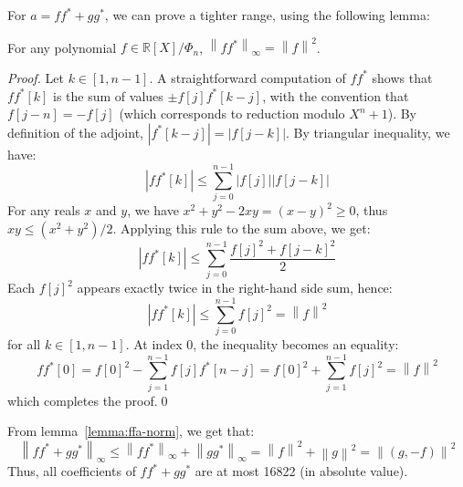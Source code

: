 \documentclass{llncs}
\newcommand{\bR}{\mathbb{R}}
\newcommand{\norm}[1]{\left\|#1\right\|}
\newcommand{\norminf}[1]{\norm{#1}_{\infty}}
\newcommand{\adj}[1]{{#1}^*}
\begin{document}
For $a = f\adj{f} + g\adj{g}$, we can prove a tighter range, using
the following lemma:
\begin{lemma}\label{lemma:ffa-norm}
For any polynomial $f \in \bR[X]/\Phi_n$, $\norminf{f\adj{f}} = \norm{f}^2$.
\end{lemma}
\begin{proof}
Let $k\in [1, n-1]$. A straightforward computation of $f\adj{f}$ shows
that $f\adj{f}[k]$ is the sum of values $\pm f[j] \adj{f}[k - j]$, with
the convention that $f[j - n] = -f[j]$ (which corresponds to reduction
modulo $X^n + 1$). By definition of the adjoint,
$|\adj{f}[k - j]| = |f[j - k]|$. By triangular inequality, we have:
\begin{equation*}
    |f\adj{f}[k]| \leq \sum_{j=0}^{n-1} |f[j]| |f[j - k]|
\end{equation*}
For any reals $x$ and $y$, we have $x^2 + y^2 - 2xy = (x - y)^2 \geq 0$,
thus $xy \leq (x^2 + y^2)/2$. Applying this rule to the sum above, we
get:
\begin{equation*}
    |f\adj{f}[k]| \leq \sum_{j=0}^{n-1} \frac{f[j]^2 + f[j - k]^2}{2}
\end{equation*}
Each $f[j]^2$ appears exactly twice in the right-hand side sum, hence:
\begin{equation*}
    |f\adj{f}[k]| \leq \sum_{j=0}^{n-1} f[j]^2 = \norm{f}^2
\end{equation*}
for all $k\in [1, n-1]$. At index 0, the inequality becomes an equality:
\begin{equation*}
    f\adj{f}[0] = f[0]^2 - \sum_{j=1}^{n-1} f[j] \adj{f}[n - j]
        = f[0]^2 + \sum_{j=1}^{n-1} f[j]^2 = \norm{f}^2
\end{equation*}
which completes the proof.\qed
\end{proof}

From lemma~\ref{lemma:ffa-norm}, we get that:
\begin{equation*}
    \norminf{f\adj{f} + g\adj{g}} \leq \norminf{f\adj{f}} + \norminf{g\adj{g}}
        = \norm{f}^2 + \norm{g}^2 = \norm{(g,-f)}^2
\end{equation*}
Thus, all coefficients of $f\adj{f} + g\adj{g}$ are at most 16822 (in
absolute value).
\end{document}
